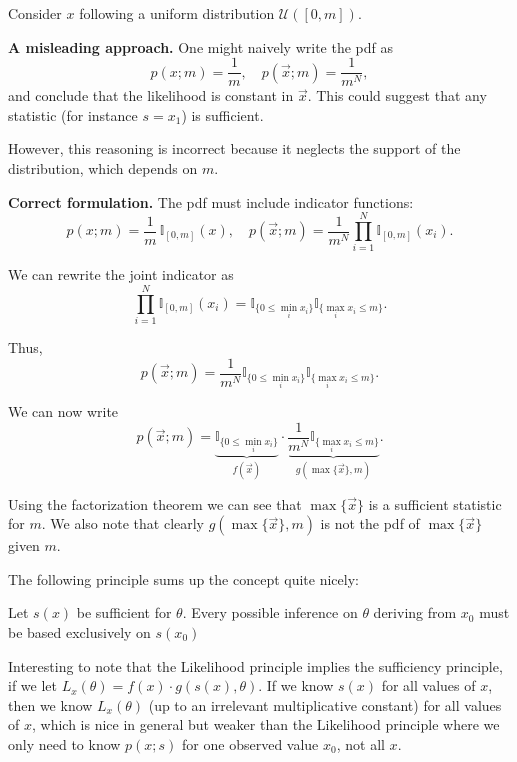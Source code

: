 \begin{example}\label{ex:uniform_sufficient_statistics}
	Consider $x$ following a uniform distribution $\mathcal{U}([0,m])$.
	
	\textbf{A misleading approach.} One might naively write the pdf as
	\[
	p(x;m)=\frac{1}{m}, 
	\quad
	p(\vec{x};m)=\frac{1}{m^N},
	\]
	and conclude that the likelihood is constant in $\vec{x}$. This could suggest that any statistic (for instance $s=x_1$) is sufficient.
	
	However, this reasoning is incorrect because it neglects the support of the distribution, which depends on $m$.

	\textbf{Correct formulation.} The pdf must include indicator functions:
	\[
	p(x;m)=\frac{1}{m}\,\mathbb{I}_{[0,m]}(x),
	\quad
	p(\vec{x};m)=\frac{1}{m^N}\prod_{i=1}^N \mathbb{I}_{[0,m]}(x_i).
	\]
	
	We can rewrite the joint indicator as
	\[
	\prod_{i=1}^N \mathbb{I}_{[0,m]}(x_i)
	=
	\mathbb{I}_{\{0 \le \min_i x_i\}}
	\mathbb{I}_{\{\max_i x_i \le m\}}.
	\]
	
	Thus,
	\[
	p(\vec{x};m)
	=
	\frac{1}{m^N}
	\mathbb{I}_{\{0 \le \min_i x_i\}}
	\mathbb{I}_{\{\max_i x_i \le m\}}.
	\]

	We can now write
	\[
	p(\vec{x};m)
	=
	\underbrace{\mathbb{I}_{\{0 \le \min_i x_i\}}}_{f(\vec{x})}
	\cdot
	\underbrace{\frac{1}{m^N}\mathbb{I}_{\{\max_i x_i \le m\}}}_{g(\max\{\vec{x}\},m)}.
	\]
	
	Using the factorization theorem we can see that $\max\{\vec{x}\}$ is a sufficient statistic for $m$. We also note that clearly $g(\max\{\vec{x}\},m)$ is not the pdf of $\max\{\vec{x}\}$ given $m$.
\end{example}

The following principle sums up the concept quite nicely:

\begin{theorem}
	Let $s(x)$ be sufficient for $\theta$. Every possible inference on $\theta$ deriving from $x_0$ must be based exclusively on $s(x_0)$
\end{theorem}

Interesting to note that the Likelihood principle implies the sufficiency principle, if we let $L_x(\theta)=f(x)\cdot g(s(x),\theta)$. If we know $s(x)$ for all values of $x$, then we know $L_x(\theta)$ (up to an irrelevant multiplicative constant) for all values of $x$, which is nice in general but weaker than the Likelihood principle where we only need to know $p(x;s)$ for one observed value $x_0$, not all $x$. 

